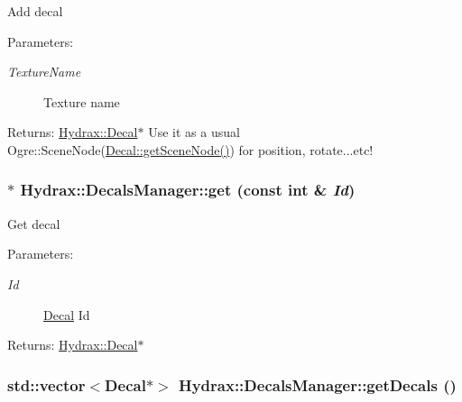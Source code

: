 Add decal \begin{Desc}
\item[Parameters:]
\begin{description}
\item[{\em TextureName}]Texture name \end{description}
\end{Desc}
\begin{Desc}
\item[Returns:]\hyperlink{class_hydrax_1_1_decal}{Hydrax::Decal}$\ast$ Use it as a usual Ogre::SceneNode(\hyperlink{class_hydrax_1_1_decal_c2570f0d1977b11ccb5746a3518210c2}{Decal::getSceneNode()}) for position, rotate...etc! \end{Desc}
\hypertarget{class_hydrax_1_1_decals_manager_4517322445c0c202cf252e64c3dc348a}{
\subsubsection[{get}]{ $\ast$ Hydrax::DecalsManager::get (const int \& {\em Id})}}
\label{class_hydrax_1_1_decals_manager_4517322445c0c202cf252e64c3dc348a}


Get decal \begin{Desc}
\item[Parameters:]
\begin{description}
\item[{\em Id}]\hyperlink{class_hydrax_1_1_decal}{Decal} Id \end{description}
\end{Desc}
\begin{Desc}
\item[Returns:]\hyperlink{class_hydrax_1_1_decal}{Hydrax::Decal}$\ast$ \end{Desc}
\hypertarget{class_hydrax_1_1_decals_manager_4877d20f120ba74a270843de234420f3}{
\subsubsection[{getDecals}]{\setlength{\rightskip}{0pt plus 5cm}std::vector$<${\bf Decal}$\ast$$>$ Hydrax::DecalsManager::getDecals ()}}
\label{class_hydrax_1_1_decals_manager_4877d20f120ba74a270843de234420f3}


